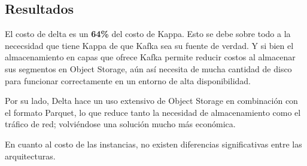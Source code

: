 \newpage

\subsection{Resultados}

El costo de delta es un \textbf{64\%} del costo de Kappa. 
Esto se debe sobre todo a la nececsidad que tiene Kappa de que Kafka sea su fuente de verdad.
Y si bien el almacenamiento en capas que ofrece Kafka permite reducir costos al almacenar sus segmentos en Object Storage,
aún así necesita de mucha cantidad de disco para funcionar correctamente en un entorno de alta disponibilidad.\newline

Por su lado, Delta hace un uso extensivo de Object Storage en combinación con el formato Parquet, lo que reduce 
tanto la necesidad de almacenamiento como el tráfico de red; volviéndose una solución mucho más económica.\newline

En cuanto al costo de las instancias, no existen diferencias significativas entre las arquitecturas. 
\newpage